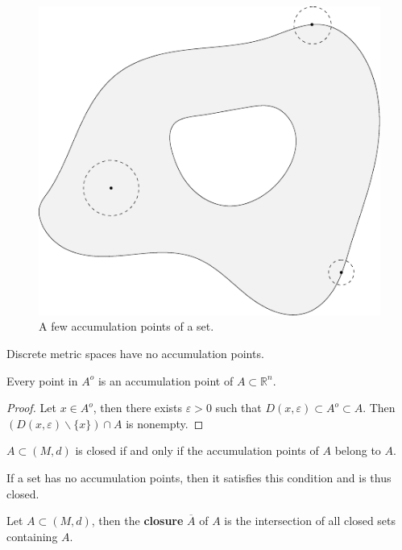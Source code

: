 \documentclass[10pt]{report}
\begin{document}
\begin{figure}[H]
	\centering
	\includegraphics[scale=0.6]{fig/accumulation-pt.pdf}
	\caption{A few accumulation points of a set.}
\end{figure}


\begin{ex}[]
Discrete metric spaces have no accumulation points.
\end{ex}

\begin{prop}
	Every point in $A^o$ is an accumulation point of $A \subset \mathbb{R}^n$.
\end{prop}
\begin{proof}
	Let $x \in A^o$, then there exists $\varepsilon>0$ such that $D(x,\varepsilon) \subset A^o \subset A$. Then $(D(x,\varepsilon) \backslash \{x\}) \cap A$ is nonempty.
\end{proof}

\begin{prop}
	$A \subset (M,d)$ is closed if and only if the accumulation points of $A$ belong to $A$.
\end{prop}

If a set has no accumulation points, then it satisfies this condition and is thus closed.

\begin{defn}[]
	Let $A \subset (M,d)$, then the \textbf{closure} $\overline{A}$ of $A$ is the intersection of all closed sets containing $A$.
\end{defn}
\end{document}
